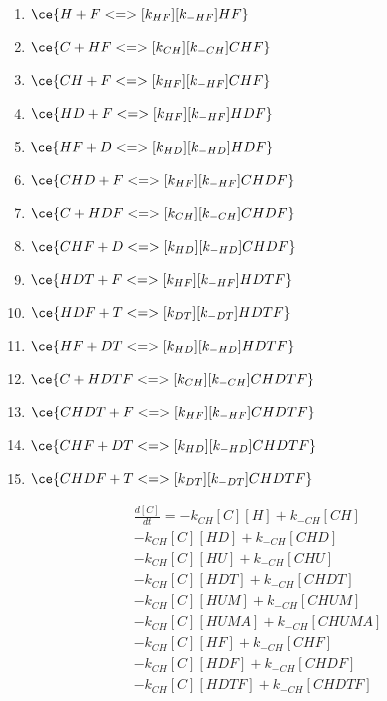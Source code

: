 \begin{enumerate}
\item $\ce{H + F <=>[k_{HF}][k_{-HF}] HF}$ %
\item $\ce{C + HF <=>[k_{CH}][k_{-CH}] CHF}$ %
\item $\ce{CH + F <=>[k_{HF}][k_{-HF}] CHF}$ %
\item $\ce{HD + F <=>[k_{HF}][k_{-HF}] HDF}$ %
\item $\ce{HF + D <=>[k_{HD}][k_{-HD}] HDF}$ %
\item $\ce{CHD + F <=>[k_{HF}][k_{-HF}] CHDF}$ %
\item $\ce{C + HDF <=>[k_{CH}][k_{-CH}] CHDF}$ %
\item $\ce{CHF + D <=>[k_{HD}][k_{-HD}] CHDF}$ %
\item $\ce{HDT + F <=>[k_{HF}][k_{-HF}] HDTF}$ %
\item $\ce{HDF + T <=>[k_{DT}][k_{-DT}] HDTF}$ %
\item $\ce{HF + DT <=>[k_{HD}][k_{-HD}] HDTF}$ %
\item $\ce{C + HDTF <=>[k_{CH}][k_{-CH}] CHDTF}$ %
\item $\ce{CHDT + F <=>[k_{HF}][k_{-HF}] CHDTF}$ %
\item $\ce{CHF + DT <=>[k_{HD}][k_{-HD}] CHDTF}$ %
\item $\ce{CHDF + T <=>[k_{DT}][k_{-DT}] CHDTF}$ %

\end{enumerate}


\begin{equation}
\begin{split}
\frac{d[C]}{dt} =     - k_{CH}[C][H]    + k_{-CH}[CH]     \\%
                      - k_{CH}[C][HD]   + k_{-CH}[CHD]    \\%
                      - k_{CH}[C][HU]   + k_{-CH}[CHU]    \\%
                      - k_{CH}[C][HDT]  + k_{-CH}[CHDT]   \\%
                      - k_{CH}[C][HUM]  + k_{-CH}[CHUM]   \\%
                      - k_{CH}[C][HUMA] + k_{-CH}[CHUMA]  \\%
                      - k_{CH}[C][HF] + k_{-CH}[CHF]      \\%
                      - k_{CH}[C][HDF] + k_{-CH}[CHDF]    \\%
                      - k_{CH}[C][HDTF] + k_{-CH}[CHDTF]  \\%
\end{split}
\end{equation}

